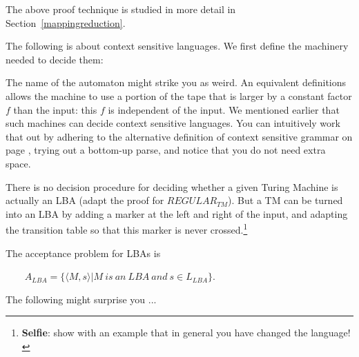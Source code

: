 The above proof technique is studied in more detail in
Section~\ref{mappingreduction}.


The following is about context sensitive languages. We first define
the machinery needed to decide them: 


The name of the automaton might strike you as weird. An equivalent
definitions allows the machine to use a portion of the tape that is
larger by a constant factor $f$ than the input: this $f$ is
independent of the input. We mentioned earlier that such machines can
decide context sensitive languages. You can intuitively work that out
by adhering to the alternative definition of context sensitive grammar
on page \pageref{altdefcs}, trying out a bottom-up parse, and notice
that you do not need extra space.

There is no decision procedure for deciding whether a given Turing
Machine is actually an LBA (adapt the proof for $REGULAR_{TM}$). But a
TM can be turned into an LBA by adding a marker at the left and right
of the input, and adapting the transition table so that this marker is
never crossed.\footnote{{\bf Selfie}: show with an example that in
  general you have changed the language!}


The acceptance problem for LBAs is

$~~~~~~~~~A_{LBA} = \{\langle M,s \rangle | M~is~an~LBA~and~s \in L_{LBA}\}$.

The following might surprise you ...


